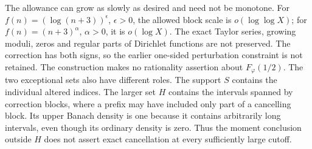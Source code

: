 The allowance can grow as slowly as desired and need not be monotone.
For $f(n)=(\log(n+3))^\epsilon$, $\epsilon>0$, the allowed block scale
is $o(\log\log X)$; for $f(n)=(n+3)^\alpha$, $\alpha>0$, it is
$o(\log X)$. The exact Taylor series, growing moduli, zeros and regular
parts of Dirichlet functions are not preserved. The correction has both signs, so the earlier one-sided perturbation
constraint is not retained. The construction makes no rationality
assertion about $F_\varphi(1/2)$.
The two exceptional sets also have different roles. The support $S$
contains the individual altered indices. The larger set $H$ contains
the intervals spanned by correction blocks, where a prefix may have
included only part of a cancelling block. Its upper Banach density is
one because it contains arbitrarily long intervals, even though its
ordinary density is zero. Thus the moment conclusion outside $H$
does not assert exact cancellation at every sufficiently large cutoff.

